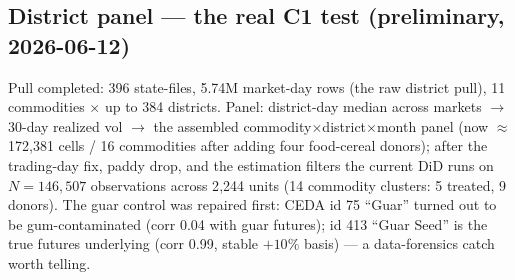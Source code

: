 \documentclass[11pt]{article}
\begin{document}
\subsection{District panel --- the real C1 test (preliminary, 2026-06-12)}
Pull completed: 396 state-files, 5.74M market-day rows (the raw district pull),
11 commodities $\times$ up to 384 districts. Panel: district-day median across markets
$\to$ 30-day realized vol $\to$ the assembled commodity$\times$district$\times$month panel
(now $\approx$172{,}381 cells / 16 commodities after adding four food-cereal donors); after
the trading-day fix, paddy drop, and the estimation filters the current DiD runs on
$N=146{,}507$ observations across 2{,}244 units (14 commodity clusters: 5 treated, 9 donors). The guar control was
repaired first: CEDA id 75 ``Guar'' turned out to be gum-contaminated (corr 0.04 with
guar futures); id 413 ``Guar Seed'' is the true futures underlying (corr 0.99, stable
$+10\%$ basis) --- a data-forensics catch worth telling.
\end{document}
